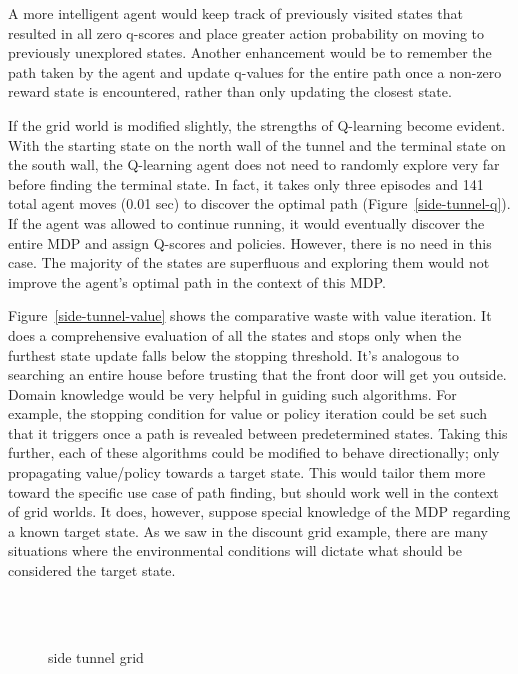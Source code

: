 \documentclass{sig-alternate}
\begin{document}
A more intelligent agent would keep track of previously visited states that resulted in all zero q-scores and place greater action probability on moving to previously unexplored states. Another enhancement would be to remember the path taken by the agent and update q-values for the entire path once a non-zero reward state is encountered, rather than only updating the closest state.

If the grid world is modified slightly, the strengths of Q-learning become evident. With the starting state on the north wall of the tunnel and the terminal state on the south wall, the Q-learning agent does not need to randomly explore very far before finding the terminal state. In fact, it takes only three episodes and 141 total agent moves (0.01 sec) to discover the optimal path (Figure~\ref{side-tunnel-q}). If the agent was allowed to continue running, it would eventually discover the entire MDP and assign Q-scores and policies. However, there is no need in this case. The majority of the states are superfluous and exploring them would not improve the agent's optimal path in the context of this MDP.

Figure~\ref{side-tunnel-value} shows the comparative waste with value iteration. It does a comprehensive evaluation of all the states and stops only when the furthest state update falls below the stopping threshold. It's analogous to searching an entire house before trusting that the front door will get you outside. Domain knowledge would be very helpful in guiding such algorithms. For example, the stopping condition for value or policy iteration could be set such that it triggers once a path is revealed between predetermined states. Taking this further, each of these algorithms could be modified to behave directionally; only propagating value/policy towards a target state. This would tailor them more toward the specific use case of path finding, but should work well in the context of grid worlds. It does, however, suppose special knowledge of the MDP regarding a known target state. As we saw in the discount grid example, there are many situations where the environmental conditions will dictate what should be considered the target state.


\begin{figure}[!htbp]
    \centering
    \\
    \\
    \caption{side tunnel grid}
\end{figure} 
\end{document}
